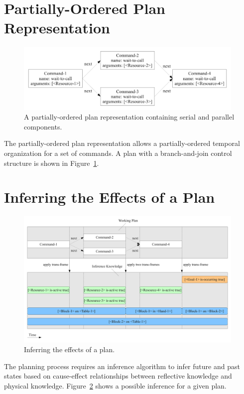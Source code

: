 \section{Partially-Ordered Plan Representation}

\begin{figure}[bth]
  \center
  \includegraphics[width=11cm]{gfx/serial_and_parallel_plan}
  \caption[A partially-ordered plan with serial and parallel
    components.]{A partially-ordered plan representation containing
    serial and parallel components.}
  \label{fig:serial_and_parallel_plan}
\end{figure}

The partially-ordered plan representation allows a partially-ordered
temporal organization for a set of commands.  A plan with a
branch-and-join control structure is shown in
Figure~\ref{fig:serial_and_parallel_plan}.


\section{Inferring the Effects of a Plan}

\begin{figure}[bth]
  \center
  \includegraphics[width=11cm]{gfx/infer_plan_effects}
  \caption[Inferring the effects of a plan.]{Inferring the effects of
    a plan.}
  \label{fig:infer_plan_effects}
\end{figure}

The planning process requires an inference algorithm to infer future
and past states based on cause-effect relationships between reflective
knowledge and physical knowledge.  Figure~\ref{fig:infer_plan_effects}
shows a possible inference for a given plan.


